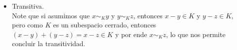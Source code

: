 \begin{homeworkProblem}
\begin{solution}
\begin{enumerate}[(i)]
\begin{enumerate}[(a)]
\begin{itemize}
            \item Transitiva.\\
              Note que si asumimos que $x\sim_{K}y$ y $y\sim_{K}z$, entonces $x-y\in K$ y $y-z\in K$, pero como $K$ es un subespacio cerrado, entonces $(x-y)+(y-z)=x-z\in K$ y por ende $x\sim_{K}z$, lo que nos permite concluir la transitividad. 
          \end{itemize}
      \end{enumerate}
    \end{enumerate}
  \end{solution}
\end{homeworkProblem}
